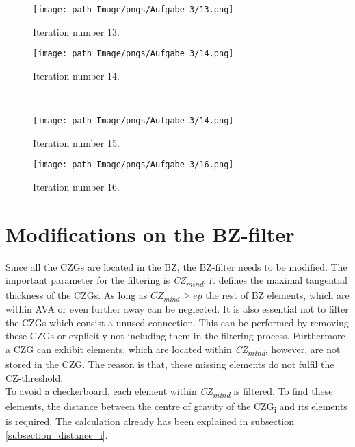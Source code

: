 \begin{figure}[!h]
\begin{minipage}{0.48\textwidth}
\centering
  \texttt{[image: path\_Image/pngs/Aufgabe\_3/13.png]}
	\caption{Iteration number 13.} 
	\label{fig_nr_iteration_13}
\end{minipage}
\hfill
\begin{minipage}{0.48\textwidth}
\centering
  \texttt{[image: path\_Image/pngs/Aufgabe\_3/14.png]}
	\caption{Iteration number 14.} 
	\label{fig_nr_iteration_14}
\end{minipage}\\

\vspace{0.3cm}
\begin{minipage}{0.48\textwidth}
\centering
  \texttt{[image: path\_Image/pngs/Aufgabe\_3/14.png]}
	\caption{Iteration number 15.} 
	\label{fig_nr_iteration_15}
\end{minipage}
\hfill
\begin{minipage}{0.48\textwidth}
\centering
  \texttt{[image: path\_Image/pngs/Aufgabe\_3/16.png]}
	\caption{Iteration number 16.} 
	\label{fig_nr_iteration_16}
\end{minipage}
\end{figure}

\section{Modifications on the BZ-filter}
\label{section_cgz_bz_filter}
Since all the CZGs are located in the BZ, the BZ-filter needs to be modified.
The important parameter for the filtering is 
\textit{CZ\textsubscript{mind}}: it defines the maximal
tangential thickness of the CZGs. As long as $CZ_{mind} \geq ep$ 
the rest of BZ elements, which are within AVA or even further away
 can be neglected. It is also essential not to filter the 
 CZGs which consist a unused connection. This can be performed
 by removing these CZGs or explicitly not including them in
 the filtering process. Furthermore a CZG can exhibit elements, which
 are located within \textit{CZ\textsubscript{mind}}, however,
 are not stored in the CZG. The reason is that, these missing elements
 do not fulfil the CZ-threshold.\\
 To avoid a checkerboard,
    each element within \textit{CZ\textsubscript{mind}} is filtered.
   To find these elements, the distance between the centre of gravity
    of the CZG\textsubscript{i} and its elements is required. 
    The calculation already has been explained in 
    subsection \ref{subsection_distance_i}.
   
